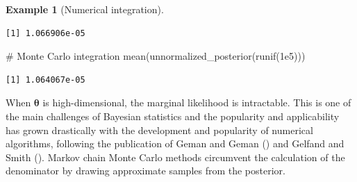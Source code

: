 \documentclass[
  11pt,
  letterpaper,
]{scrbook}
\newenvironment{Shaded}{\begin{snugshade}}{\end{snugshade}}
\newcommand{\CommentTok}[1]{\textcolor[rgb]{0.37,0.37,0.37}{#1}}
\newcommand{\FloatTok}[1]{\textcolor[rgb]{0.68,0.00,0.00}{#1}}
\newcommand{\FunctionTok}[1]{\textcolor[rgb]{0.28,0.35,0.67}{#1}}
\newcommand{\NormalTok}[1]{\textcolor[rgb]{0.00,0.23,0.31}{#1}}
\theoremstyle{definition}
\newtheorem{example}{Example}[chapter]
\theoremstyle{plain}
\theoremstyle{plain}
\theoremstyle{plain}
\theoremstyle{definition}
\theoremstyle{definition}
\theoremstyle{plain}
\theoremstyle{plain}
\theoremstyle{remark}
\begin{document}
\begin{example}[Numerical
integration]
\begin{verbatim}
[1] 1.066906e-05
\end{verbatim}

\begin{Shaded}
\begin{Highlighting}[]
\CommentTok{\# Monte Carlo integration}
\FunctionTok{mean}\NormalTok{(}\FunctionTok{unnormalized\_posterior}\NormalTok{(}\FunctionTok{runif}\NormalTok{(}\FloatTok{1e5}\NormalTok{)))}
\end{Highlighting}
\end{Shaded}

\begin{verbatim}
[1] 1.064067e-05
\end{verbatim}

\end{example}

When \(\boldsymbol{\theta}\) is high-dimensional, the marginal
likelihood is intractable. This is one of the main challenges of
Bayesian statistics and the popularity and applicability has grown
drastically with the development and popularity of numerical algorithms,
following the publication of Geman and Geman
() and Gelfand and Smith
(). Markov chain Monte Carlo
methods circumvent the calculation of the denominator by drawing
approximate samples from the posterior.
\end{document}
